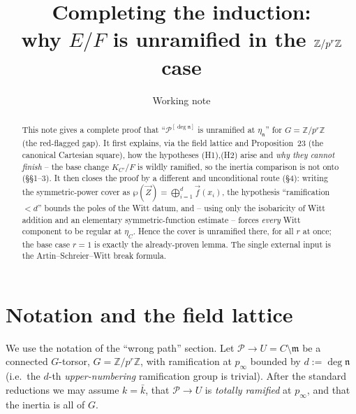 \documentclass[11pt]{article}
\title{Completing the induction:\\ why $E/F$ is unramified in the $\Z/p^r\Z$ case}
\author{Working note}
\date{}
\newcommand{\cP}{\mathcal{P}}
\newcommand{\Z}{\mathbb{Z}}
\newcommand{\mdls}{\mathfrak{m}}
\newcommand{\ndls}{\mathfrak{n}}
\newcommand{\AS}{\wp}
\theoremstyle{plain}
\theoremstyle{definition}
\providecommand{\AS}{\ensuremath{\wp}}
\begin{document}
\maketitle

\begin{abstract}
This note gives a complete proof that
``$\cP^{[\deg\ndls]}$ is unramified at $\eta_\ndls$'' for $G=\Z/p^r\Z$
(the red-flagged gap). It first explains, via the field lattice and Proposition~23
(the canonical Cartesian square), how the hypotheses (H1),(H2) arise and \emph{why they
cannot finish} -- the base change $K_{C'}/F$ is wildly ramified, so the inertia comparison
is not onto (\S\S1--3). It then closes the proof by a different and unconditional route
(\S4): writing the symmetric-power cover as $\AS(\vec Z)=\bigoplus_{i=1}^d\vec f(x_i)$, the
hypothesis ``ramification $<d$'' bounds the poles of the Witt datum, and -- using only the
isobaricity of Witt addition and an elementary symmetric-function estimate -- forces
\emph{every} Witt component to be regular at $\eta_C$. Hence the cover is unramified there,
for all $r$ at once; the base case $r=1$ is exactly the already-proven lemma. The single
external input is the Artin--Schreier--Witt break formula.
\end{abstract}

\tableofcontents

\section{Notation and the field lattice}

We use the notation of the ``wrong path'' section. Let $\cP\to U=C\setminus\mdls$ be a
connected $G$-torsor, $G=\Z/p^r\Z$, with ramification at $p_\infty$ bounded by $d:=\deg\ndls$
(i.e.\ the $d$-th \emph{upper-numbering} ramification group is trivial). After the standard
reductions we may assume $k=\bar k$, that $\cP\to U$ is \emph{totally ramified} at $p_\infty$,
and that the inertia is all of $G$.
\end{document}
